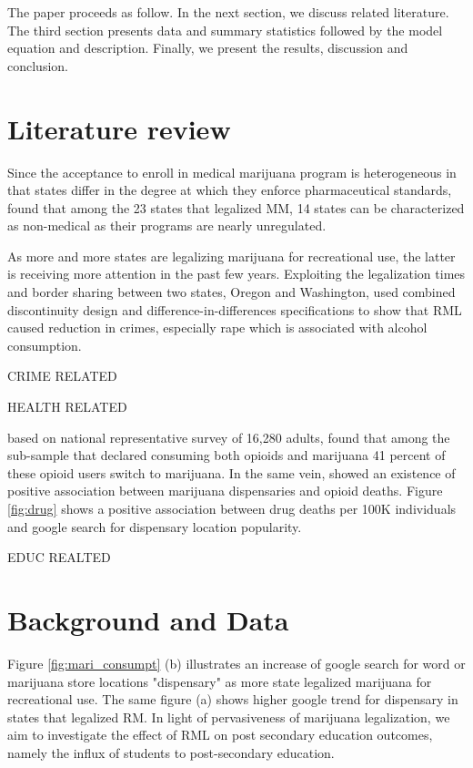 \documentclass[12pt]{article}%
\begin{document}
The paper proceeds as follow. In the next section, we discuss related literature. The third section presents data and summary statistics followed by the model equation and description. Finally, we present the results, discussion and conclusion. 







\section{Literature review}

Since the acceptance to enroll in medical marijuana program is heterogeneous in that states differ in the degree at which they enforce pharmaceutical standards, \cite{williams2016older} found that among the 23 states that legalized MM, 14 states can be characterized as non-medical as their programs are nearly unregulated.

As more and more states are legalizing marijuana for recreational use, the latter is receiving more attention in the past few years. Exploiting the legalization times and border sharing between two states, Oregon and Washington, \cite{dragone2019crime} used combined discontinuity design and difference-in-differences specifications to show that RML caused reduction in crimes, especially rape which is associated with alcohol consumption.

CRIME RELATED

HEALTH RELATED

based on national representative survey of 16,280 adults,\cite{ishida2019substitution} found that among the sub-sample that declared consuming both opioids and marijuana 41 percent of these opioid users switch to marijuana. In the same vein,
\cite{mathur2022marijuana} showed an existence of positive association between marijuana dispensaries and opioid deaths. Figure \ref{fig:drug} shows a positive association between drug deaths per 100K individuals and google search for dispensary location popularity. 

EDUC REALTED
\section{Background and Data}
Figure \ref{fig:mari_consumpt} (b) illustrates an increase of google search for word or marijuana store locations "dispensary" as more state legalized marijuana for recreational use. The same figure (a) shows higher google trend for dispensary in states that legalized RM. In light of pervasiveness of marijuana legalization, we aim to investigate the effect of RML on post secondary education outcomes, namely the influx of students to post-secondary education. 
\end{document}
